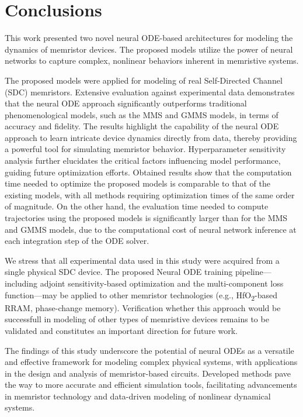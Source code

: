 \documentclass{ieeeaccess}
\begin{document}
\section{Conclusions}

This work presented two novel neural ODE-based architectures for modeling the dynamics of memristor devices. The proposed models utilize the power of neural networks to capture complex, nonlinear behaviors inherent in memristive systems.


The proposed models were applied for modeling of real Self-Directed Channel (SDC) memristors. 
Extensive evaluation against experimental data demonstrates that the neural ODE approach significantly outperforms traditional phenomenological models, such as the MMS and GMMS models, in terms of accuracy and fidelity. The results highlight the capability of the neural ODE approach to learn intricate device dynamics directly from data, thereby providing a powerful tool for simulating  memristor behavior. Hyperparameter sensitivity analysis further elucidates the critical factors influencing model performance, guiding future optimization efforts.
Obtained results show that the computation time needed to optimize the proposed models is comparable to that of the existing models, with all methods requiring optimization times of the same order of magnitude. On the other hand, the evaluation time needed to compute trajectories using the proposed models is significantly larger than for the MMS and GMMS models, due to the computational cost of neural network inference at each integration step of the ODE solver.

We stress that all experimental data used in this study were acquired from a single physical SDC device. The proposed Neural ODE training pipeline---including adjoint sensitivity-based optimization and the multi-component loss function---may be applied to other memristor technologies (e.g., HfO\textsubscript{2}-based RRAM, phase-change memory). Verification whether this approach would be successfull in modeling of other types of memristive devices remains to be validated and constitutes an important direction for future work.

The findings of this study underscore the potential of neural ODEs as a versatile and effective framework for modeling complex physical systems, with applications in the design and analysis of memristor-based circuits.
Developed methods pave the way to more accurate and efficient simulation tools, facilitating advancements in memristor technology  and data-driven modeling of nonlinear dynamical systems.







\EOD
\end{document}
